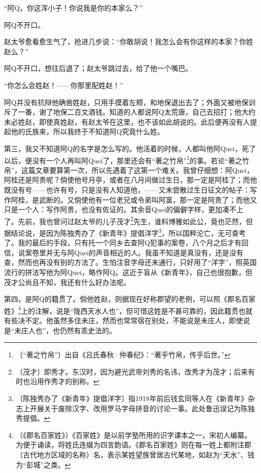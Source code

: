 \documentclass[12pt,UTF-8,openany]{ctexbook}
\begin{document}
\begin{large}
    “阿Q，你这浑小子！你说我是你的本家么？”
    
    阿Q不开口。
    
    赵太爷愈看愈生气了，抢进几步说：“你敢胡说！我怎么会有你这样的本家？你姓赵么？”
    
    阿Q不开口，想往后退了；赵太爷跳过去，给了他一个嘴巴。
    
    “你怎么会姓赵！——你那里配姓赵！”
    
    阿Q并没有抗辩他确凿姓赵，只用手摸着左颊，和地保退出去了；外面又被地保训斥了一番，谢了地保二百文酒钱。知道的人都说阿Q太荒唐，自己去招打；他大约未必姓赵，即使真姓赵，有赵太爷在这里，也不该如此胡说的。此后便再没有人提起他的氏族来，所以我终于不知道阿Q究竟什么姓。
    
    第三，我又不知道阿Q的名字是怎么写的。他活着的时候，人都叫他阿Quei，死了以后，便没有一个人再叫阿Quei了，那里还会有“著之竹帛”\footnote{〔“著之竹帛”〕出自《吕氏春秋·仲春纪》：“著乎竹帛，传乎后世。”}的事。若论“著之竹帛”，这篇文章要算第一次，所以先遇着了这第一个难关。我曾仔细想：阿Quei，阿桂还是阿贵呢？倘使他号月亭，或者在八月间做过生日，那一定是阿桂了；而他既没有号——也许有号，只是没有人知道他，——又未尝散过生日征文的帖子：写作阿桂，是武断的。又倘使他有一位老兄或令弟叫阿富，那一定是阿贵了；而他又只是一个人：写作阿贵，也没有佐证的。其余音Quei的偏僻字样，更加凑不上了。先前，我也曾问过赵太爷的儿子茂才\footnote{〔茂才〕即秀才。东汉时，因为避光武帝刘秀的名讳，改秀才为茂才；后来有时也沿用作秀才的别称。}先生，谁料博雅如此公，竟也茫然，但据结论说，是因为陈独秀办了《新青年》提倡洋字\footnote{〔陈独秀办了《新青年》提倡洋字〕指1918年前后钱玄同等人在《新青年》杂志上开展关于废除汉字、改用罗马字母拼音的讨论一事。此处鲁迅误记为陈独秀提倡。}，所以国粹沦亡，无可查考了。我的最后的手段，只有托一个同乡去查阿Q犯事的案卷，八个月之后才有回信，说案卷里并无与阿Quei的声音相近的人。我虽不知道是真没有，还是没有查，然而也再没有别的方法了。生怕注音字母还未通行，只好用了“洋字”，照英国流行的拼法写他为阿Quei，略作阿Q。这近于盲从《新青年》，自己也很抱歉，但茂才公尚且不知，我还有什么好办法呢。
    
    第四，是阿Q的籍贯了。倘他姓赵，则据现在好称郡望的老例，可以照《郡名百家姓》\footnote{〔《郡名百家姓》〕《百家姓》是以前学塾所用的识字课本之一，宋初人编纂。为便于诵读，将姓氏连缀为四言韵语。《郡名百家姓》则在每一姓上都附注郡（古代地方区域的名称）名，表示某姓望族曾居古代某地，如赵为“天水”、钱为“彭城”之类。}上的注解，说是“陇西天水人也”，但可惜这姓是不甚可靠的，因此籍贯也就有些决不定。他虽然多住未庄，然而也常常宿在别处，不能说是未庄人，即使说是“未庄人也”，也仍然有乖史法的。
    

\end{large}
\end{document}
